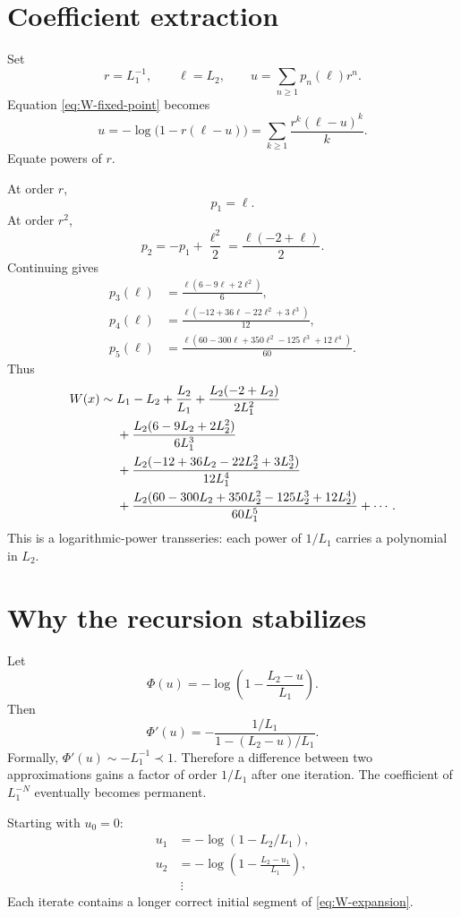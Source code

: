 \documentclass[11pt,openany]{book}
\theoremstyle{definition}
\theoremstyle{plain}
\theoremstyle{remark}
\newcommand{\asym}{\sim}
\newcommand{\precdom}{\prec}
\begin{document}
\section{Coefficient extraction}

Set
\[
 r=L_1^{-1},
 \qquad \ell=L_2,
 \qquad
 u=\sum_{n\ge1}p_n(\ell)r^n.
\]
Equation \cref{eq:W-fixed-point} becomes
\[
 u=-\log\bigl(1-r(\ell-u)\bigr)
 =\sum_{k\ge1}\frac{r^k(\ell-u)^k}{k}.
\]
Equate powers of $r$.

At order $r$,
\[
 p_1=\ell.
\]
At order $r^2$,
\[
 p_2=-p_1+\frac{\ell^2}{2}
 =\frac{\ell(-2+\ell)}2.
\]
Continuing gives
\begin{align*}
 p_3(\ell)&=\frac{\ell(6-9\ell+2\ell^2)}6,\\
 p_4(\ell)&=\frac{\ell(-12+36\ell-22\ell^2+3\ell^3)}{12},\\
 p_5(\ell)&=\frac{\ell(60-300\ell+350\ell^2-125\ell^3+12\ell^4)}{60}.
\end{align*}
Thus
\begin{align}
 W(x)\asym{}&L_1-L_2+\frac{L_2}{L_1}
 +\frac{L_2(-2+L_2)}{2L_1^2}\notag\\
 &+\frac{L_2(6-9L_2+2L_2^2)}{6L_1^3}\notag\\
 &+\frac{L_2(-12+36L_2-22L_2^2+3L_2^3)}{12L_1^4}\notag\\
 &+\frac{L_2(60-300L_2+350L_2^2-125L_2^3+12L_2^4)}{60L_1^5}
 +\cdots.
\label{eq:W-expansion}
\end{align}
This is a logarithmic-power transseries: each power of $1/L_1$ carries a polynomial in $L_2$.

\section{Why the recursion stabilizes}

Let
\[
 \Phi(u)=-\log\left(1-\frac{L_2-u}{L_1}\right).
\]
Then
\[
 \Phi'(u)=-\frac{1/L_1}{1-(L_2-u)/L_1}.
\]
Formally, $\Phi'(u)\asym-L_1^{-1}\precdom1$. Therefore a difference between two approximations gains a factor of order $1/L_1$ after one iteration. The coefficient of $L_1^{-N}$ eventually becomes permanent.

Starting with $u_0=0$:
\begin{align*}
 u_1&=-\log(1-L_2/L_1),\\
 u_2&=-\log\left(1-\frac{L_2-u_1}{L_1}\right),\\
 &\ \vdots
\end{align*}
Each iterate contains a longer correct initial segment of \cref{eq:W-expansion}.
\end{document}
